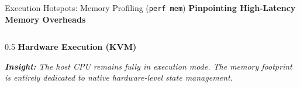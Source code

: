 \documentclass[aspectratio=169]{beamer} %
\begin{document}
\begin{frame}{Execution Hotspots: Memory Profiling (\texttt{perf mem})}
      \textbf{Pinpointing High-Latency Memory Overheads}
      \vspace{0.2cm}

      \begin{columns}[T]
          \begin{column}{0.5\textwidth}
              \textbf{Hardware Execution (KVM)}
              \vspace{0.1cm}
              \begin{table}[]
                  \renewcommand{\arraystretch}{1.2}
              \end{table}
              \vspace{0.1cm}
              \footnotesize \textit{\textbf{Insight:} The host CPU remains fully in execution mode. The memory footprint is entirely dedicated to native hardware-level state management.}
          \end{column}


\end{columns}
\end{frame}
\end{document}
